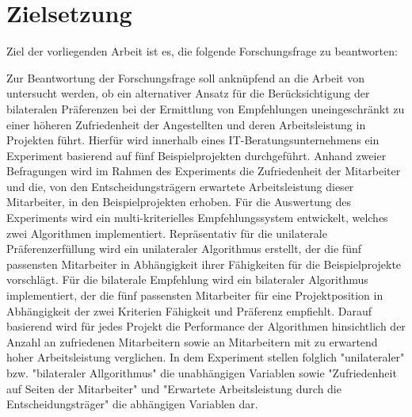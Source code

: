 \section{Zielsetzung}
\label{sec:einletung:zielsetzung}
Ziel der vorliegenden Arbeit ist es, die folgende Forschungsfrage zu beantworten:

\forschungsfrage

Zur Beantwortung der Forschungsfrage soll anknüpfend an die Arbeit von \textcite[S. 1ff.]{link:booklet} untersucht werden, ob ein alternativer Ansatz für die Berücksichtigung der bilateralen Präferenzen bei der Ermittlung von Empfehlungen uneingeschränkt zu einer höheren Zufriedenheit der Angestellten und deren Arbeitsleistung in Projekten führt.
Hierfür wird innerhalb eines IT-Beratungsunternehmens ein Experiment basierend auf fünf Beispielprojekten durchgeführt.
Anhand zweier Befragungen wird im Rahmen des Experiments die Zufriedenheit der Mitarbeiter und die, von den Entscheidungsträgern erwartete Arbeitsleistung dieser Mitarbeiter, in den Beispielprojekten erhoben.
Für die Auswertung des Experiments wird ein multi-kriterielles Empfehlungssystem entwickelt, welches zwei Algorithmen implementiert.
Repräsentativ für die unilaterale Präferenzerfüllung wird ein unilateraler Algorithmus erstellt, der die fünf passensten Mitarbeiter in Abhängigkeit ihrer Fähigkeiten für die Beispielprojekte vorschlägt.
Für die bilaterale Empfehlung wird ein bilateraler Algorithmus implementiert, der die fünf passensten Mitarbeiter für eine Projektposition in Abhängigkeit der zwei Kriterien Fähigkeit und Präferenz empfiehlt.
Darauf basierend wird für jedes Projekt die Performance der Algorithmen hinsichtlich der Anzahl an zufriedenen Mitarbeitern sowie an Mitarbeitern mit zu erwartend hoher Arbeitsleistung verglichen.
In dem Experiment stellen folglich "unilateraler" bzw. "bilateraler Allgorithmus" die unabhängigen Variablen sowie "Zufriedenheit auf Seiten der Mitarbeiter" und "Erwartete Arbeitsleistung durch die Entscheidungsträger" die abhängigen Variablen dar.


